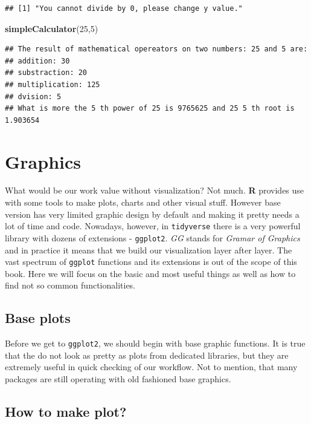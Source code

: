 \documentclass[]{book}
\newenvironment{Shaded}{\begin{snugshade}}{\end{snugshade}}
\newcommand{\KeywordTok}[1]{\textcolor[rgb]{0.13,0.29,0.53}{\textbf{#1}}}
\newcommand{\DecValTok}[1]{\textcolor[rgb]{0.00,0.00,0.81}{#1}}
\newcommand{\NormalTok}[1]{#1}
\theoremstyle{definition}
\theoremstyle{definition}
\theoremstyle{definition}
\theoremstyle{remark}
\begin{document}
\begin{verbatim}
## [1] "You cannot divide by 0, please change y value."
\end{verbatim}

\begin{Shaded}
\begin{Highlighting}[]
\KeywordTok{simpleCalculator}\NormalTok{(}\DecValTok{25}\NormalTok{,}\DecValTok{5}\NormalTok{)}
\end{Highlighting}
\end{Shaded}

\begin{verbatim}
## The result of mathematical opereators on two numbers: 25 and 5 are: 
## addition: 30 
## substraction: 20 
## multiplication: 125 
## dvision: 5 
## What is more the 5 th power of 25 is 9765625 and 25 5 th root is 1.903654
\end{verbatim}

\chapter{Graphics}\label{graphs}

What would be our work value without visualization? Not much. \textbf{R}
provides use with some tools to make plots, charts and other visual
stuff. However base version has very limited graphic design by default
and making it pretty needs a lot of time and code. Nowadays, however, in
\texttt{tidyverse} there is a very powerful library with dozens of
extensions - \texttt{ggplot2}. \emph{GG} stands for \emph{Gramar of
Graphics} and in practice it means that we build our visualization layer
after layer. The vast spectrum of \texttt{ggplot} functions and its
extensions is out of the scope of this book. Here we will focus on the
basic and most useful things as well as how to find not so common
functionalities.

\section{Base plots}\label{base-plots}

Before we get to \texttt{ggplot2}, we should begin with base graphic
functions. It is true that the do not look as pretty as plots from
dedicated libraries, but they are extremely useful in quick checking of
our workflow. Not to mention, that many packages are still operating
with old fashioned base graphics.

\section{How to make plot?}\label{how-to-make-plot}
\end{document}
